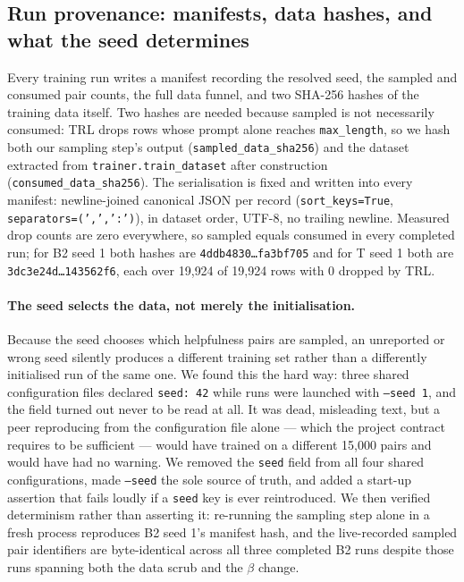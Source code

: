 \subsection{Run provenance: manifests, data hashes, and what the seed determines}
\label{sec:methods:provenance}

Every training run writes a manifest recording the resolved seed, the sampled and consumed
pair counts, the full data funnel, and two SHA-256 hashes of the training data itself. Two
hashes are needed because sampled is not necessarily consumed: TRL drops rows whose prompt
alone reaches \texttt{max\_length}, so we hash both our sampling step's output
(\texttt{sampled\_data\_sha256}) and the dataset extracted from
\texttt{trainer.train\_dataset} after construction (\texttt{consumed\_data\_sha256}). The
serialisation is fixed and written into every manifest: newline-joined canonical JSON per
record (\texttt{sort\_keys=True}, \texttt{separators=(',',':')}), in dataset order, UTF-8,
no trailing newline. Measured drop counts are zero everywhere, so sampled equals consumed
in every completed run; for B2 seed 1 both hashes are
\texttt{4ddb4830\ldots fa3bf705} and for T seed 1 both are \texttt{3dc3e24d\ldots 143562f6},
each over 19{,}924 of 19{,}924 rows with 0 dropped by TRL.

\paragraph{The seed selects the data, not merely the initialisation.} Because the seed
chooses which helpfulness pairs are sampled, an unreported or wrong seed silently produces a
different training set rather than a differently initialised run of the same one. We found
this the hard way: three shared configuration files declared \texttt{seed: 42} while runs
were launched with \texttt{--seed 1}, and the field turned out never to be read at all. It
was dead, misleading text, but a peer reproducing from the configuration file alone --- which
the project contract requires to be sufficient --- would have trained on a different 15{,}000
pairs and would have had no warning. We removed the \texttt{seed} field from all four shared
configurations, made \texttt{--seed} the sole source of truth, and added a start-up assertion
that fails loudly if a \texttt{seed} key is ever reintroduced. We then verified determinism
rather than asserting it: re-running the sampling step alone in a fresh process reproduces
B2 seed 1's manifest hash, and the live-recorded sampled pair identifiers are byte-identical
across all three completed B2 runs despite those runs spanning both the data scrub and the
$\beta$ change.

